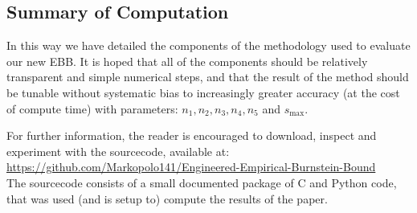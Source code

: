 \documentclass[aap,preprint]{imsart}
\begin{document}
\subsection{Summary of Computation}
In this way we have detailed the components of the methodology used to evaluate our new EBB.
It is hoped that all of the components should be relatively transparent and simple numerical steps, and that the result of the method should be tunable without systematic bias to increasingly greater accuracy (at the cost of compute time) with parameters: $n_1,n_2,n_3,n_4,n_5$ and $s_\text{max}$.

For further information, the reader is encouraged to download, inspect and experiment with the sourcecode, available at:\\\href{https://github.com/Markopolo141/Engineered-Empirical-Burnstein-Bound}{https://github.com/Markopolo141/Engineered-Empirical-Burnstein-Bound}\\
The sourcecode consists of a small documented package of C and Python code, that was used (and is setup to) compute the results of the paper.

\newpage


\end{document}
